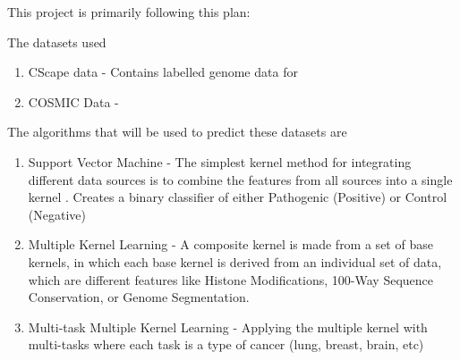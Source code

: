 \documentclass[11pt]{article}
\begin{document}
This project is primarily following this plan:

The datasets used
\begin{enumerate}
	\item CScape data \cite{Rogers2017} - Contains labelled genome data for 
	\item COSMIC Data - 
\end{enumerate}


The algorithms that will be used to predict these datasets are
\begin{enumerate}
	\item Support Vector Machine - The simplest kernel method for integrating different data sources is to combine the features from all sources into a single kernel \cite{Rogers2017}. Creates a binary classifier of either Pathogenic (Positive) or Control (Negative)
	\item Multiple Kernel Learning - A composite kernel is made from a set of base kernels, in which each base kernel is derived from an individual set of data, which are different features like Histone Modifications, 100-Way Sequence Conservation, or Genome Segmentation.
	\item Multi-task Multiple Kernel Learning - Applying the multiple kernel with multi-tasks where each task is a type of cancer (lung, breast, brain, etc)
\end{enumerate}
\end{document}
